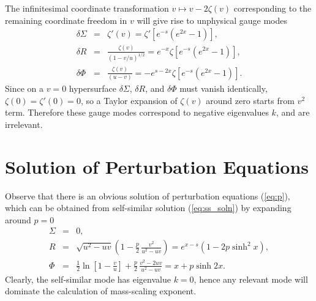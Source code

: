 The infinitesimal coordinate transformation $v \mapsto v - 2\zeta(v)$
corresponding to the remaining coordinate freedom in $v$ will give rise
to unphysical gauge modes
\begin{eqnarray} \label{eq:gauge}
  \delta\Sigma &=& \zeta'(v)
    = \zeta'[e^{-s}(e^{2x}-1)], \nonumber\\
  \delta R &=& \frac{\zeta(v)}{(1-v/u)^{1/2}}
    = e^{-x} \zeta[e^{-s}(e^{2x}-1)], \nonumber\\
  \delta\Phi &=& \frac{\zeta(v)}{(u-v)}
    = - e^{s-2x} \zeta[e^{-s}(e^{2x}-1)].
\end{eqnarray}
Since on a $v=0$ hypersurface $\delta\Sigma$, $\delta R$, and
$\delta\Phi$ must vanish identically, $\zeta(0)=\zeta'(0)=0$, so a
Taylor expansion of $\zeta(v)$ around zero starts from $v^2$ term.
Therefore these gauge modes correspond to negative eigenvalues $k$, and
are irrelevant.


\section{Solution of Perturbation Equations} \label{sec:pert_soln}

Observe that there is an obvious solution of perturbation equations
(\ref{eq:p}), which can be obtained from self-similar solution
(\ref{eq:ss_soln}) by expanding around $p=0$
\begin{eqnarray} \label{eq:ss_mode}
  \Sigma &=& 0,\nonumber\\
  R &=& \sqrt{u^2 - uv} \left(1 - \frac{p}{2}\, \frac{v^2}{u^2 - uv}\right)
    = e^{x-s} \left(1 - 2 p \sinh^2 x\right),\nonumber\\
  \Phi &=& \frac{1}{2} \ln \left[1 - \frac{v}{u}\right] +
    \frac{p}{2}\, \frac{v^2 - 2uv}{u^2 - uv}
    = x + p \sinh 2x.
\end{eqnarray}
Clearly, the self-similar mode has eigenvalue $k=0$, hence any relevant
mode will dominate the calculation of mass-scaling exponent.

